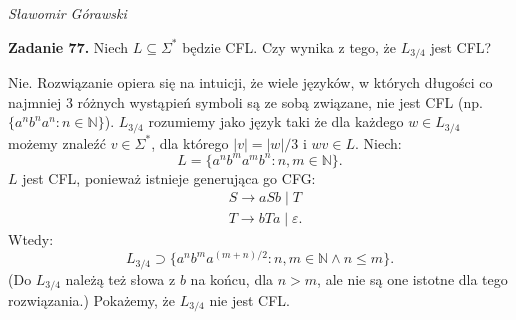 \documentclass{article}
\begin{document}
\begin{flushright}
\textit{Sławomir Górawski}
\end{flushright}

\bigskip

\noindent\textbf{Zadanie 77.}
Niech $L \subseteq \Sigma^*$ będzie CFL.
Czy wynika z tego, że $L_{3/4}$ jest CFL?

\bigskip

\noindent
Nie. Rozwiązanie opiera się na intuicji, że wiele języków,
w których długości co najmniej 3 różnych wystąpień symboli są ze sobą związane,
nie jest CFL (np. $\{ a^n b^n a^n : n \in \mathbb{N} \}$).
$L_{3/4}$ rozumiemy jako język taki że dla każdego $w \in L_{3/4}$
możemy znaleźć $v \in \Sigma^*$, dla którego $|v| = |w|/3$ i $wv \in L$.
Niech:
\[
    L = \{ a^n b^m a^m b^n : n, m \in \mathbb{N} \}.
\]
$L$ jest CFL, ponieważ istnieje generująca go CFG:
\begin{align*}
    & S \rightarrow aSb \; | \; T \\
    & T \rightarrow bTa \; | \; \varepsilon.
\end{align*}
Wtedy:
\[
    L_{3/4} \supset \{
        a^n b^m a^{(m + n) / 2} : n, m \in \mathbb{N} \land n \le m
    \}.
\]
(Do $L_{3/4}$ należą też słowa z $b$ na końcu, dla $n > m$,
ale nie są one istotne dla tego rozwiązania.)
Pokażemy, że $L_{3/4}$ nie jest CFL.
\end{document}
